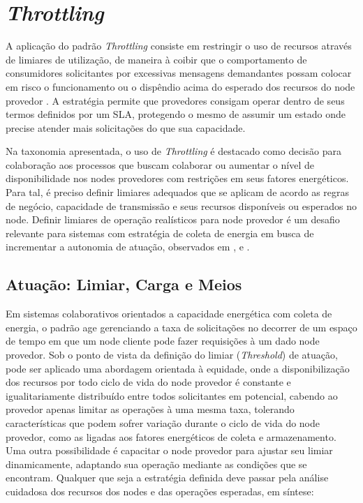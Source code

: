 \section{\textit{Throttling}}


A aplicação do padrão \textit{Throttling} consiste em restringir o uso de recursos através de limiares de utilização, de maneira à coibir que o comportamento de consumidores solicitantes por excessivas mensagens demandantes possam colocar em risco o funcionamento ou o dispêndio acima do esperado dos recursos do node provedor \cite{martinekuan_throttling_nodate}. A estratégia permite que provedores consigam operar dentro de seus termos definidos por um \acf{SLA}, protegendo o mesmo de assumir um estado onde precise atender mais solicitações do que sua capacidade.

 Na taxonomia apresentada, o uso de \textit{Throttling} é destacado como decisão para colaboração aos processos que buscam colaborar ou aumentar o nível de disponibilidade nos nodes provedores com restrições em seus fatores energéticos. Para tal, é preciso definir limiares adequados que se aplicam de acordo as regras de negócio, capacidade de transmissão e seus recursos disponíveis ou esperados no node. Definir limiares de operação realísticos para node provedor é um desafio relevante para sistemas com estratégia de coleta de energia em busca de incrementar a autonomia de atuação, observados em \cite{khairnar_discrete-rate_2015}, \cite{liu_energy_2016} e \cite{zhang_toward_2018}.

\subsection{Atuação: Limiar, Carga e Meios}
Em sistemas colaborativos orientados a capacidade energética com coleta de energia, o padrão age gerenciando a taxa de solicitações no decorrer de um espaço de tempo em que um node cliente pode fazer requisições à um dado node provedor. Sob o ponto de vista da definição do limiar (\textit{Threshold}) de atuação, pode ser aplicado uma abordagem orientada à equidade, onde a disponibilização dos recursos por todo ciclo de vida do node provedor é constante e igualitariamente distribuído entre todos solicitantes em potencial, cabendo ao provedor apenas limitar as operações à uma mesma taxa, tolerando características que podem sofrer variação durante o ciclo de vida do node provedor, como as ligadas aos fatores energéticos de coleta e armazenamento.  Uma outra possibilidade é capacitar o node provedor para ajustar seu limiar dinamicamente, adaptando sua operação mediante as condições que se encontram. Qualquer que seja a estratégia definida deve passar pela análise cuidadosa dos recursos dos nodes  e das operações esperadas, em síntese: 

